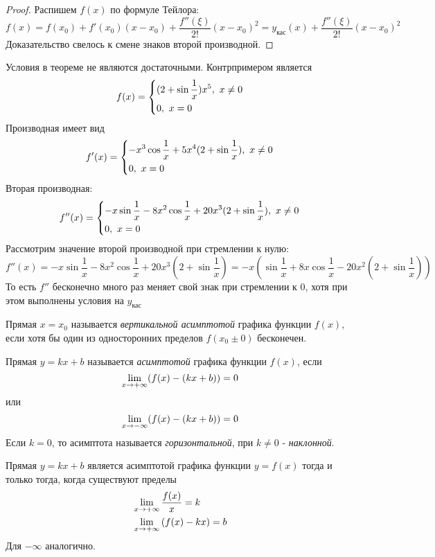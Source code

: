 \begin{proof}
	Распишем $f(x)$ по формуле Тейлора:
	\[
		f(x) = f(x_0) + f'(x_0)(x - x_0) + \frac{f''(\xi)}{2!}(x - x_0)^2 = y_{\text{кас}}(x) + \frac{f''(\xi)}{2!}(x - x_0)^2
	\]
	Доказательство свелось к смене знаков второй производной.
\end{proof}

\begin{note}
	Условия в теореме не являются достаточными. Контрпримером является
	\[
		f(x) = \left\{\begin{aligned}
			&{(2 + \sin \frac{1}{x})x^5,\ x \neq 0}
			\\
			&{0,\ x = 0}
		\end{aligned}\right.
	\]
	Производная имеет вид
	\[
		f'(x) = \left\{\begin{aligned}
			&{-x^3\cos \frac{1}{x} + 5x^4(2 + \sin \frac{1}{x}),\ x \neq 0}
			\\
			&{0,\ x = 0}
		\end{aligned}\right.
	\]
	Вторая производная:
	\[
		f''(x) = \left\{\begin{aligned}
			&{-x\sin \frac{1}{x} - 8x^2 \cos \frac{1}{x} + 20x^3 (2 + \sin \frac{1}{x}),\ x \neq 0}
			\\
			&{0,\ x = 0}
		\end{aligned}\right.
	\]
	Рассмотрим значение второй производной при стремлении к нулю:
	\[
		f''(x) = -x\sin \frac{1}{x} - 8x^2 \cos \frac{1}{x} + 20x^3 (2 + \sin \frac{1}{x}) = -x \left(\sin \frac{1}{x} + 8x \cos \frac{1}{x} - 20x^2 (2 + \sin \frac{1}{x})\right)
	\]
	То есть $f''$ бесконечно много раз меняет свой знак при стремлении к 0, хотя при этом выполнены условия на $y_{\text{кас}}$
\end{note}


\begin{definition}
	Прямая $x = x_0$ называется \textit{вертикальной асимптотой} графика функции $f(x)$, если хотя бы один из односторонних пределов $f(x_0 \pm 0)$ бесконечен.
\end{definition}

\begin{definition}
	Прямая $y = kx + b$ называется \textit{асимптотой} графика функции $f(x)$, если
	\[
		\lim\limits_{x \to +\infty} (f(x) - (kx + b)) = 0
	\]
	или
	\[
		\lim\limits_{x \to -\infty} (f(x) - (kx + b)) = 0
	\]
	Если $k = 0$, то асимптота называется \textit{горизонтальной}, при $k \neq 0$ - \textit{наклонной}.
\end{definition}

\begin{theorem}
	Прямая $y = kx + b$ является асимптотой графика функции $y = f(x)$ тогда и только тогда, когда существуют пределы
	\begin{align*}
		&\lim\limits_{x \to +\infty} \frac{f(x)}{x} = k
		\\
		&\lim\limits_{x \to +\infty} \left(f(x) - kx\right) = b
	\end{align*}
	Для $-\infty$ аналогично.
\end{theorem}

